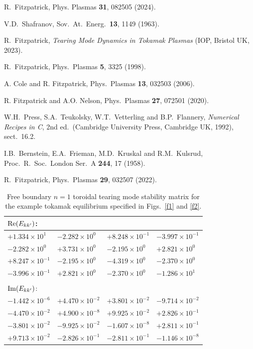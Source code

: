 \documentclass[12pt,prb,aps]{revtex4-1}
\begin{document}
\begin{thebibliography}{99}
 R.~Fitzpatrick, Phys. Plasmas {\bf 31}, 082505 (2024).

  V.D.~Shafranov, Sov.\ At.\ Energ.\  {\bf 13}, 1149 (1963).

 R.~Fitzpatrick, {\em Tearing Mode Dynamics in Tokamak Plasmas} (IOP, Bristol UK,  2023).

 R.~Fitzpatrick, Phys.\ Plasmas {\bf 5}, 3325 (1998).

 A. Cole and R. Fitzpatrick, Phys.\ Plasmas {\bf 13}, 032503 (2006).

 R. Fitzpatrick and A.O. Nelson, Phys.\ Plasmas {\bf 27}, 072501 (2020).

 W.H.~Press, S.A.~Teukolsky, W.T.~Vetterling and B.P.~Flannery, {\em Numerical Recipes in C}, 2nd ed.\
(Cambridge University Press, Cambridge UK, 1992), sect.~16.2.

 I.B.~Bernstein, E.A.~Frieman, M.D.~Kruskal and R.M.~Kulsrud, Proc.\ R.\ Soc.\ London Ser.\ A {\bf 244}, 17 (1958).

 R.~Fitzpatrick, Phys.\ Plasmas {\bf 29}, 032507 (2022).

\end{thebibliography}

\newpage
\begin{table}[h]
\centering
\begin{tabular}{llll}
${\rm Re}(E_{kk'})$:&&&\\[0.5ex]\hline
$+1.334\times 10^1$& $-2.282\times 10^0$&  $+8.248\times 10^{-1}$& $-3.997\times 10^{-1} $\\[0.5ex]
$-2.282\times 10^0$& $+3.731\times 10^0 $&$-2.195\times 10^0$ & $+2.821\times 10^0$\\[0.5ex]
$ +8.247\times 10^{-1} $&$-2.195\times 10^0$ &$-4.319\times 10^0$ &$-2.370\times 10^0$ \\[0.5ex]
$-3.996\times 10^{-1}$& $ +2.821\times 10^0$&$ -2.370\times 10^0$ &$-1.286\times 10^1$\\\hline\\[0.5ex]
${\rm Im}(E_{kk'})$:&&&\\[0.5ex]\hline
$-1.442\times 10^{-6}$&  $+4.470\times 10^{-2}$& $ +3.801\times 10^{-2}$& $-9.714\times 10^{-2}$\\[0.5ex]
$-4.470\times 10^{-2}$& $+4.900\times 10^{-8}$&  $+9.925\times 10^{-2}$&  $+2.826\times 10^{-1}$\\[0.5ex]
$-3.801\times 10^{-2}$& $-9.925\times 10^{-2}$& $-1.607\times 10^{-8}$&  $+2.811\times 10^{-1}$\\[0.5ex]
 $+9.713\times 10^{-2}$& $-2.826\times 10^{-1}$& $-2.811\times 10^{-1}$ &$-1.146\times 10^{-8}$
\\\hline
\end{tabular}
\caption{Free boundary $n=1$ toroidal tearing mode stability matrix for the example tokamak equilibrium specified in Figs.~\ref{f1} and \ref{f2}. }\label{t1}
\end{table}
\end{document}
